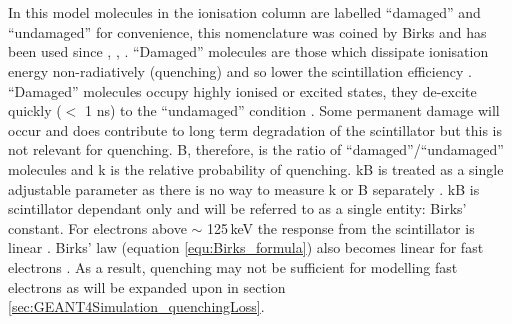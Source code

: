 \\\\In this model molecules in the ionisation column are labelled ``damaged'' and ``undamaged'' for convenience, this nomenclature was coined by Birks and has been used since \cite{birks_1964}, \cite{craun_1970}, \cite{knoll_2010}. ``Damaged'' molecules are those which dissipate ionisation energy non-radiatively (quenching) and so lower the scintillation efficiency\cite{craun_1970} \cite{knoll_2010}. ``Damaged'' molecules occupy highly ionised or excited states, they de-excite quickly ($<$ 1 ns) to the ``undamaged'' condition \cite{craun_1970}. Some permanent damage will occur and does contribute to long term degradation of the scintillator but this is not relevant for quenching\cite{craun_1970}. B, therefore, is the ratio of ``damaged''/``undamaged'' molecules and k is the relative probability of quenching. kB is treated as a single adjustable parameter as there is no way to measure k or B separately \cite{craun_1970} \cite{knoll_2010}. kB is scintillator dependant only and will be referred to as a single entity: Birks' constant. For electrons above $\sim$ 125\,keV the response from the scintillator is linear \cite{craun_1970}. Birks' law (equation \ref{equ:Birks_formula}) also becomes linear for fast electrons \cite{knoll_2010}. As a result, quenching may not be sufficient for modelling fast electrons as will be expanded upon in section \ref{sec:GEANT4Simulation_quenchingLoss}. 
